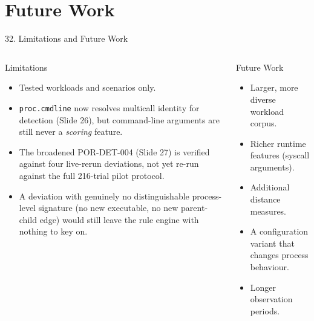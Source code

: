 \documentclass[aspectratio=169, 11pt]{beamer}
\begin{document}
\section{Future Work}
\begin{frame}{32. Limitations and Future Work}
    \footnotesize
    \begin{columns}[T]
        \begin{block}{Limitations}
            \scriptsize
            \begin{itemize}\setlength\itemsep{2pt}
                \item Tested workloads and scenarios only.
                \item \texttt{proc.cmdline} now resolves multicall identity for detection (Slide 26), but command-line arguments are still never a \emph{scoring} feature.
                \item The broadened POR-DET-004 (Slide 27) is verified against four live-rerun deviations, not yet re-run against the full 216-trial pilot protocol.
                \item A deviation with genuinely no distinguishable process-level signature (no new executable, no new parent-child edge) would still leave the rule engine with nothing to key on.
            \end{itemize}
        \end{block}
        \begin{block}{Future Work}
            \scriptsize
            \begin{itemize}\setlength\itemsep{2pt}
                \item Larger, more diverse workload corpus.
                \item Richer runtime features (syscall arguments).
                \item Additional distance measures.
                \item A configuration variant that changes process behaviour.
                \item Longer observation periods.
            \end{itemize}
        \end{block}
    \end{columns}
\end{frame}

\end{document}
